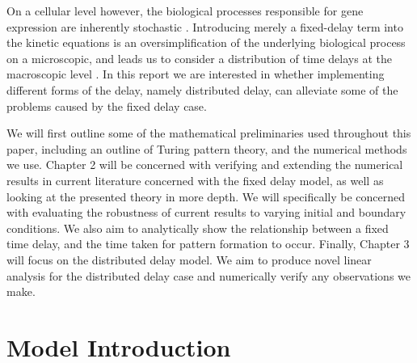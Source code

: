 On a cellular level however, the biological processes responsible for gene expression are inherently stochastic \cite{raj,elowitz,mcadams,paulsson}. Introducing merely a fixed-delay term into the kinetic equations is an oversimplification of the underlying biological process on a microscopic, and leads us to consider a distribution of time delays at the macroscopic level \cite{bratsun,krausenew}. In this report we are interested in whether implementing different forms of the delay, namely distributed delay, can alleviate some of the problems caused by the fixed delay case.

We will first outline some of the mathematical preliminaries used throughout this paper, including an outline of Turing pattern theory, and the numerical methods we use. Chapter 2 will be concerned with verifying and extending the numerical results in current literature concerned with the fixed delay model, as well as looking at the presented theory in more depth. We will specifically be concerned with evaluating the robustness of current results to varying initial and boundary conditions. We also aim to analytically show the relationship between a fixed time delay, and the time taken for pattern formation to occur. Finally, Chapter 3 will focus on the distributed delay model. We aim to produce novel linear analysis for the distributed delay case and numerically verify any observations we make.
\section{Model Introduction}
